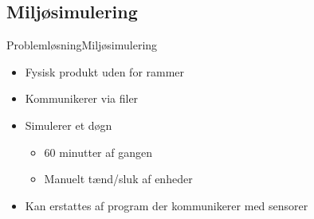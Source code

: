 \subsection{Miljøsimulering}
\begin{frame}{Problemløsning}{Miljøsimulering}
\begin{itemize}
	\item Fysisk produkt uden for rammer
	\item Kommunikerer via filer
	\item Simulerer et døgn
	\begin{itemize}
		\item 60 minutter af gangen
		\item Manuelt tænd/sluk af enheder
	\end{itemize}
	\item Kan erstattes af program der kommunikerer med sensorer
\end{itemize}
\end{frame}